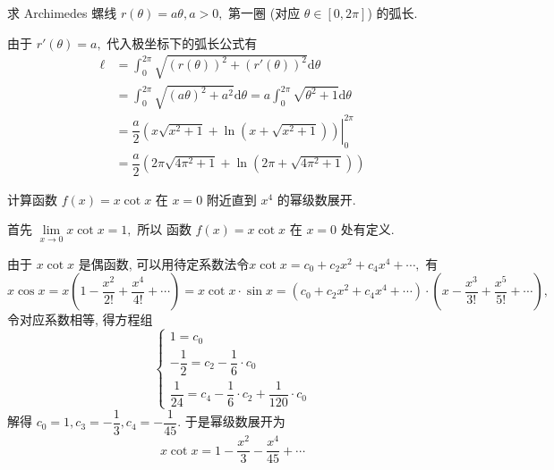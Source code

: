 
\begin{question}[points = 10]
  求 Archimedes 螺线 $r(\theta) = a\theta, a > 0,$ 第一圈 (对应 $\theta \in [0, 2\pi]$) 的弧长.

\end{question}

\begin{solution}
  由于 $r'(\theta) = a,$ 代入极坐标下的弧长公式有
  \begin{align*}
    \ell & = \int_{0}^{2\pi} \sqrt{\left(r(\theta)\right)^2 + \left(r'(\theta)\right)^2} \mathrm{d} \theta \\
    & = \int_{0}^{2\pi} \sqrt{\left(a \theta\right)^2 + a^2} \mathrm{d} \theta = a \int_{0}^{2\pi} \sqrt{\theta^2 + 1} \mathrm{d} \theta \\
    & = \left. \dfrac{a}{2} \left( x \sqrt{x^2 + 1} + \ln \left( x + \sqrt{x^2 + 1} \right) \right) \right|_{0}^{2\pi} \\
    & = \dfrac{a}{2} \left( 2\pi \sqrt{4 \pi^2 + 1} + \ln \left( 2\pi + \sqrt{4 \pi^2 + 1} \right) \right)
  \end{align*}
\end{solution}

\begin{question}[points = 10]
  计算函数 $f(x) = x\cot x$ 在 $x = 0$ 附近直到 $x^4$ 的幂级数展开.

\end{question}

\begin{solution}
  首先 $\lim\limits_{x \to 0} x\cot x = 1,$ 所以 函数 $f(x) = x\cot x$ 在 $x = 0$ 处有定义.

  由于 $x\cot x$ 是偶函数, 可以用待定系数法令$x\cot x = c_0 + c_2 x^2 + c_4 x^4 + \cdots,$ 有
  $$x\cos x = x\left( 1 - \dfrac{x^2}{2!} + \dfrac{x^4}{4!} + \cdots \right) = x\cot x \cdot \sin x = \left( c_0 + c_2 x^2 + c_4 x^4 + \cdots \right) \cdot \left(x - \dfrac{x^3}{3!} + \dfrac{x^5}{5!} + \cdots\right),$$
  令对应系数相等, 得方程组
  $$\begin{cases}
    1 = c_0 \\
    -\dfrac{1}{2} = c_2 - \dfrac{1}{6} \cdot c_0 \\
    \dfrac{1}{24} = c_4 - \dfrac{1}{6} \cdot c_2 + \dfrac{1}{120} \cdot c_0
  \end{cases}$$
  解得 $c_0 = 1, c_3 = - \dfrac{1}{3}, c_4 = - \dfrac{1}{45}.$ 于是幂级数展开为
  $$x\cot x = 1 - \dfrac{x^2}{3} - \dfrac{x^4}{45} + \cdots$$
\end{solution}


